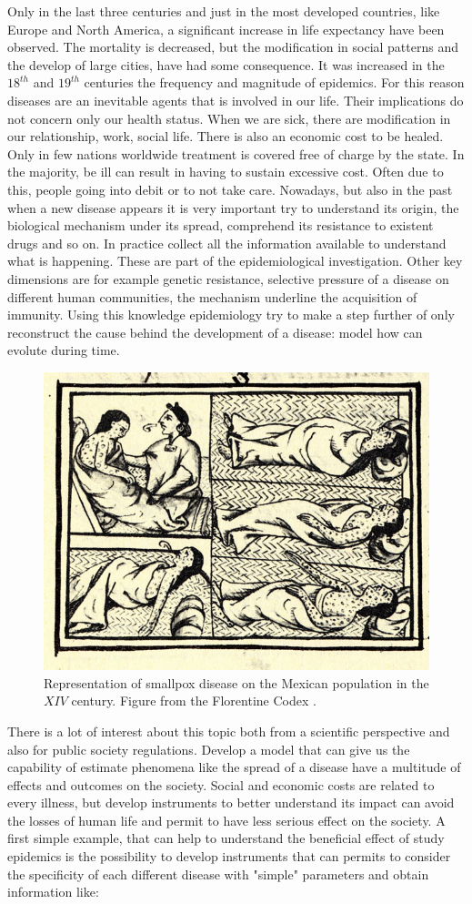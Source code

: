 Only in the last three centuries and just in the most developed countries, like Europe and North America, a significant increase in life expectancy have been observed. The mortality is decreased, but the modification in social patterns and the develop of large cities, have had some consequence. It was increased in the $18^{th}$ and $19^{th}$ centuries the frequency and magnitude of epidemics. 
For this reason diseases are an inevitable agents that is involved in our life. Their implications do not concern only our health status. When we are sick, there are modification in our relationship, work, social life. There is also an economic cost to be healed. Only in few nations worldwide treatment is covered free of charge by the state. In the majority, be ill can result in having to sustain excessive cost. Often due to this, people going into debit or to not take care. 
Nowadays, but also in the past when a new disease appears it is very important try to understand its origin, the biological mechanism under its spread, comprehend its resistance to existent drugs and so on. In practice collect all the information available to understand what is happening.  
These are part of the epidemiological investigation. Other key dimensions are for example genetic resistance, selective pressure of a disease on different human communities, the mechanism underline the acquisition of immunity. Using this knowledge epidemiology try to make a step further of only reconstruct the cause behind the development of a disease: model how can evolute during time. 
\begin{figure}[hbt!]
	\centering
	\includegraphics[width=0.4\linewidth]{0_introduction/images_introduction/FlorentineCodex_smallpox}
	\caption[smallpox on native Americans]{Representation of smallpox disease on the Mexican population in the $XIV$ century. Figure from the Florentine Codex \cite{Sahagun1965}. }
	\label{fig:florentinecodexsmallpox}
\end{figure}
There is a lot of interest about this topic both from a scientific perspective and also for public society regulations.
Develop a model that can give us the capability of estimate phenomena like the spread of a disease have a multitude of effects and outcomes on the society.  Social and economic costs are related to every illness, but develop instruments to better understand its impact can avoid the losses of human life and permit to have less serious effect on the society. 
A first simple example, that can help to understand the beneficial effect of study epidemics is the possibility to develop instruments that can permits to consider the specificity of each different disease with "simple" parameters and obtain information like:

